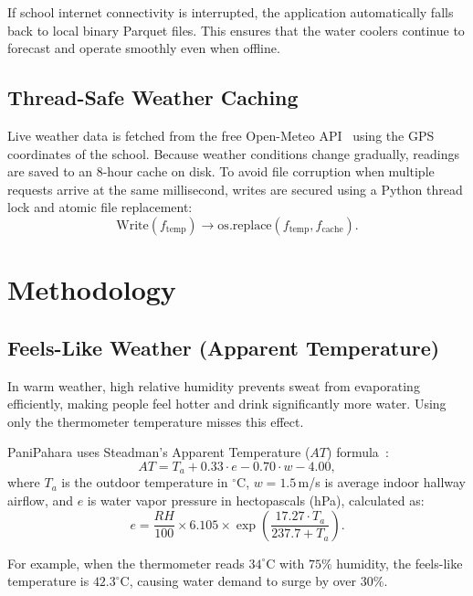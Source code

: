 \documentclass[conference]{IEEEtran}
\begin{document}
If school internet connectivity is interrupted, the application automatically falls back to local binary Parquet files. This ensures that the water coolers continue to forecast and operate smoothly even when offline.

\subsection{Thread-Safe Weather Caching}
Live weather data is fetched from the free Open-Meteo API~\cite{openmeteo2024} using the GPS coordinates of the school. Because weather conditions change gradually, readings are saved to an 8-hour cache on disk. To avoid file corruption when multiple requests arrive at the same millisecond, writes are secured using a Python thread lock and atomic file replacement:
\begin{equation}
\text{Write}(f_{\text{temp}}) \longrightarrow \text{os.replace}(f_{\text{temp}}, f_{\text{cache}}).
\end{equation}

\section{Methodology}

\subsection{Feels-Like Weather (Apparent Temperature)}
In warm weather, high relative humidity prevents sweat from evaporating efficiently, making people feel hotter and drink significantly more water. Using only the thermometer temperature misses this effect.

PaniPahara uses Steadman's Apparent Temperature ($AT$) formula~\cite{steadman1979assessment}:
\begin{equation}
AT = T_a + 0.33 \cdot e - 0.70 \cdot w - 4.00,
\end{equation}
where $T_a$ is the outdoor temperature in $^\circ\text{C}$, $w = 1.5\,$m/s is average indoor hallway airflow, and $e$ is water vapor pressure in hectopascals (hPa), calculated as:
\begin{equation}
e = \frac{RH}{100} \times 6.105 \times \exp\left( \frac{17.27 \cdot T_a}{237.7 + T_a} \right).
\end{equation}

For example, when the thermometer reads $34^\circ\text{C}$ with $75\%$ humidity, the feels-like temperature is $42.3^\circ\text{C}$, causing water demand to surge by over $30\%$.
\end{document}

